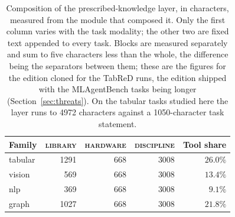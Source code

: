 \begin{table}[t]
\centering
\caption{Composition of the prescribed-knowledge layer, in characters, measured from the module that composed it. Only the first column varies with the task modality; the other two are fixed text appended to every task. Blocks are measured separately and sum to five characters less than the whole, the difference being the separators between them; these are the figures for the edition cloned for the TabReD runs, the edition shipped with the MLAgentBench tasks being longer (Section~\ref{sec:threats}). On the tabular tasks studied here the layer runs to 4972 characters against a 1050-character task statement.}
\label{tab:layersplit}
\small
\begin{tabular}{lrrrr}
\toprule
Family & \textsc{library} & \textsc{hardware} & \textsc{discipline} & Tool share \\
\midrule
tabular & 1291 & 668 & 3008 & $26.0\%$ \\
vision & 569 & 668 & 3008 & $13.4\%$ \\
nlp & 369 & 668 & 3008 & $\phantom{0}9.1\%$ \\
graph & 1027 & 668 & 3008 & $21.8\%$ \\
\bottomrule
\end{tabular}
\end{table}
